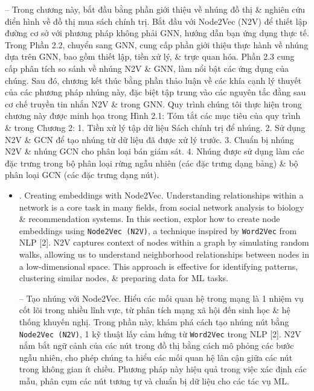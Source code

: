 \documentclass{article}
\begin{document}
\begin{itemize}
    -- Trong chương này, bắt đầu bằng phần giới thiệu về nhúng đồ thị \& nghiên cứu điển hình về đồ thị mua sách chính trị. Bắt đầu với Node2Vec (N2V) để thiết lập đường cơ sở với phương pháp không phải GNN, hướng dẫn bạn ứng dụng thực tế. Trong Phần 2.2, chuyển sang GNN, cung cấp phần giới thiệu thực hành về nhúng dựa trên GNN, bao gồm thiết lập, tiền xử lý, \& trực quan hóa. Phần 2.3 cung cấp phân tích so sánh về nhúng N2V \& GNN, làm nổi bật các ứng dụng của chúng. Sau đó, chương kết thúc bằng phần thảo luận về các khía cạnh lý thuyết của các phương pháp nhúng này, đặc biệt tập trung vào các nguyên tắc đằng sau cơ chế truyền tin nhắn N2V \& trong GNN. Quy trình chúng tôi thực hiện trong chương này được minh họa trong {\sf Hình 2.1: Tóm tắt các mục tiêu của quy trình \& trong Chương 2: 1. Tiền xử lý tập dữ liệu Sách chính trị để nhúng. 2. Sử dụng N2V \& GCN để tạo nhúng từ dữ liệu đã được xử lý trước. 3. Chuẩn bị nhúng N2V \& nhúng GCN cho phân loại bán giám sát. 4. Nhúng được sử dụng làm các đặc trưng trong bộ phân loại rừng ngẫu nhiên (các đặc trưng dạng bảng) \& bộ phân loại GCN (các đặc trưng dạng nút).}
    \begin{itemize}
        \item {. Creating embeddings with Node2Vec.} Understanding relationships within a network is a core task in many fields, from social network analysis to biology \& recommendation systems. In this section, explor how to create node embeddings using {\tt Node2Vec (N2V)}, a technique inspired by {\tt Word2Vec} from NLP [2]. N2V captures context of nodes within a graph by simulating random walks, allowing us to understand neighborhood relationships between nodes in a low-dimensional space. This approach is effective for identifying patterns, clustering similar nodes, \& preparing data for ML tasks.

        -- {\sf Tạo nhúng với Node2Vec.} Hiểu các mối quan hệ trong mạng là 1 nhiệm vụ cốt lõi trong nhiều lĩnh vực, từ phân tích mạng xã hội đến sinh học \& hệ thống khuyến nghị. Trong phần này, khám phá cách tạo nhúng nút bằng {\tt Node2Vec (N2V)}, 1 kỹ thuật lấy cảm hứng từ {\tt Word2Vec} trong NLP [2]. N2V nắm bắt ngữ cảnh của các nút trong đồ thị bằng cách mô phỏng các bước ngẫu nhiên, cho phép chúng ta hiểu các mối quan hệ lân cận giữa các nút trong không gian ít chiều. Phương pháp này hiệu quả trong việc xác định các mẫu, phân cụm các nút tương tự và chuẩn bị dữ liệu cho các tác vụ ML.


\end{itemize}
\end{itemize}
\end{document}
